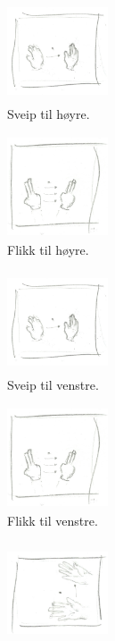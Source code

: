 \begin{figure}[h]
\begin{subfigure}{0.23\textwidth}
\includegraphics[width=3cm, height=3cm]{fig/swipe-r-l}
\caption{Sveip til høyre.}
\label{fig:sveip-}
\end{subfigure} 
\begin{subfigure}{0.23\textwidth}
\includegraphics[width=3cm, height=3cm]{fig/flick-l-r} 
\caption{Flikk til høyre.}
\label{fig:flikk-h}
\end{subfigure}
\begin{subfigure}{0.23\textwidth}
\includegraphics[width=3cm, height=3cm]{fig/swipe-r-l}
\caption{Sveip til venstre.}
\label{fig:sveip-v}
\end{subfigure} 
\begin{subfigure}{0.23\textwidth}
\includegraphics[width=3cm, height=3cm]{fig/flick-l-r}
\caption{Flikk til venstre.}
\label{fig:flikk-v}
\end{subfigure}
\begin{subfigure}{0.23\textwidth}
\includegraphics[width=3cm, height=3cm]{fig/swipe-d-u}

\end{subfigure}
\end{figure}

